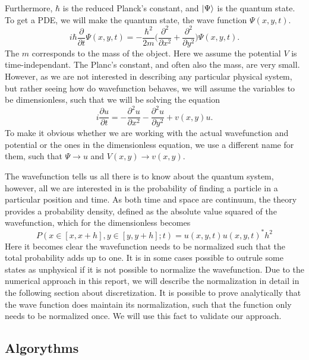 \documentclass[english,notitlepage,reprint,nofootinbib]{revtex4-1}  %
\begin{document}
Furthermore, $\hbar$ is the reduced Planck's constant, and $\ket{\Psi}$ is the quantum state. To get a PDE, we will make the quantum state, the wave function $\Psi(x,y,t)$.
\begin{equation}
    i \hbar \frac{\partial}{\partial t} \Psi (x,y,t) = - \frac{\hbar ^2}{2m} \Big( \frac{\partial ^2}{\partial x^2} + \frac{\partial ^2}{\partial y^2} \Big) \Psi(x,y,t) .
\end{equation}
The $m$ corresponds to the mass of the object. Here we assume the potential $V$ is time-independant. The Planc's constant, and often also the mass, are very small. However, as we are not interested in describing any particular physical system, but rather seeing how do wavefunction behaves, we will assume the variables to be dimensionless, such that we will be solving the equation
\begin{equation} \label{eq:2}
    i \frac{\partial u}{\partial t} = - \frac{\partial ^2 u}{\partial x^2} - \frac{\partial ^2 u}{\partial y^2} + v(x,y) u .
\end{equation}
To make it obvious whether we are working with the actual wavefunction and potential or the ones in the dimensionless equation, we use a different name for them, such that $\Psi \rightarrow u$ and $V(x,y) \rightarrow v(x,y)$.

The wavefunction tells us all there is to know about the quantum system, however, all we are interested in is the probability of finding a particle in a particular position and time. As both time and space are continuum, the theory provides a probability density, defined as the absolute value squared of the wavefunction, which for the dimensionless becomes
\begin{equation}
    P(x \in [x,x+h],y \in [y, y+h];t) = u(x,y,t) u(x,y,t)^* h^2
\end{equation}
Here it becomes clear the wavefunction needs to be normalized such that the total probability adds up to one. It is in some cases possible to outrule some states as unphysical if it is not possible to normalize the wavefunction. Due to the numerical approach in this report, we will describe the normalization in detail in the following section about discretization. It is possible to prove analytically that the wave function does maintain its normalization, such that the function only needs to be normalized once. We will use this fact to validate our approach.



\subsection{Algorythms}
\end{document}
